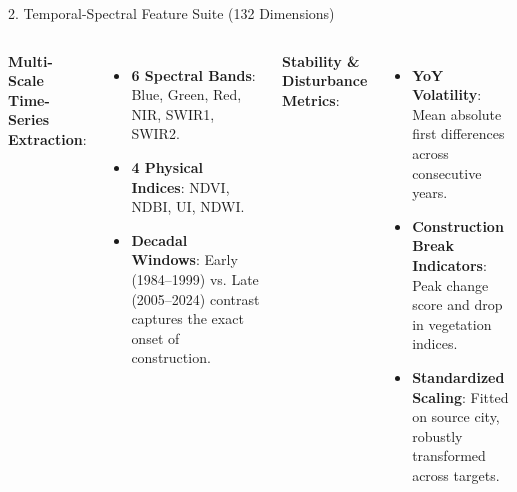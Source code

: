 \documentclass[aspectratio=169,10pt]{beamer}
\begin{document}
\begin{frame}{2. Temporal-Spectral Feature Suite (132 Dimensions)}
  \begin{columns}[T]
    \textbf{Multi-Scale Time-Series Extraction}:
    \begin{itemize}
      \item \textbf{6 Spectral Bands}: Blue, Green, Red, NIR, SWIR1, SWIR2.
      \item \textbf{4 Physical Indices}: NDVI, NDBI, UI, NDWI.
      \item \textbf{Decadal Windows}: Early (1984--1999) vs. Late (2005--2024) contrast captures the exact onset of construction.
    \end{itemize}

    \textbf{Stability \& Disturbance Metrics}:
    \begin{itemize}
      \item \textbf{YoY Volatility}: Mean absolute first differences across consecutive years.
      \item \textbf{Construction Break Indicators}: Peak change score and drop in vegetation indices.
      \item \textbf{Standardized Scaling}: Fitted on source city, robustly transformed across targets.
    \end{itemize}
  \end{columns}

  \vspace{0.3cm}
  \centering
\end{frame}
\end{document}
